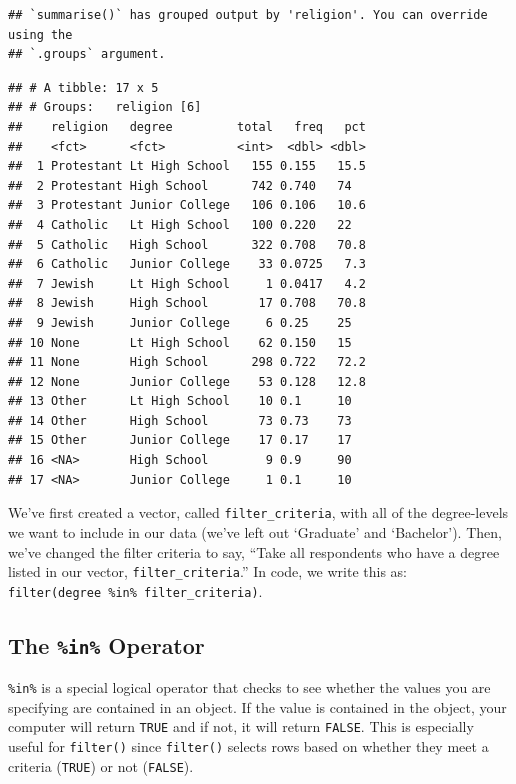 \documentclass[
]{book}
\begin{document}
\begin{verbatim}
## `summarise()` has grouped output by 'religion'. You can override using the
## `.groups` argument.
\end{verbatim}

\begin{verbatim}
## # A tibble: 17 x 5
## # Groups:   religion [6]
##    religion   degree         total   freq   pct
##    <fct>      <fct>          <int>  <dbl> <dbl>
##  1 Protestant Lt High School   155 0.155   15.5
##  2 Protestant High School      742 0.740   74  
##  3 Protestant Junior College   106 0.106   10.6
##  4 Catholic   Lt High School   100 0.220   22  
##  5 Catholic   High School      322 0.708   70.8
##  6 Catholic   Junior College    33 0.0725   7.3
##  7 Jewish     Lt High School     1 0.0417   4.2
##  8 Jewish     High School       17 0.708   70.8
##  9 Jewish     Junior College     6 0.25    25  
## 10 None       Lt High School    62 0.150   15  
## 11 None       High School      298 0.722   72.2
## 12 None       Junior College    53 0.128   12.8
## 13 Other      Lt High School    10 0.1     10  
## 14 Other      High School       73 0.73    73  
## 15 Other      Junior College    17 0.17    17  
## 16 <NA>       High School        9 0.9     90  
## 17 <NA>       Junior College     1 0.1     10
\end{verbatim}

We've first created a vector, called \texttt{filter\_criteria}, with all of the degree-levels we want to include in our data (we've left out `Graduate' and `Bachelor'). Then, we've changed the filter criteria to say, ``Take all respondents who have a degree listed in our vector, \texttt{filter\_criteria}.'' In code, we write this as: \texttt{filter(degree\ \%in\%\ filter\_criteria)}.

\hypertarget{the-in-operator}{%
\subsection{\texorpdfstring{The \texttt{\%in\%} Operator}{The \%in\% Operator}}\label{the-in-operator}}

\texttt{\%in\%} is a special logical operator that checks to see whether the values you are specifying are contained in an object. If the value is contained in the object, your computer will return \texttt{TRUE} and if not, it will return \texttt{FALSE}. This is especially useful for \texttt{filter()} since \texttt{filter()} selects rows based on whether they meet a criteria (\texttt{TRUE}) or not (\texttt{FALSE}).
\end{document}
